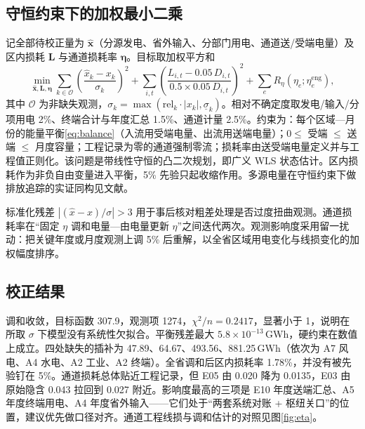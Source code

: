 \documentclass[UTF8,a4paper,zihao=-4,fontset=fandol]{ctexart}
\begin{document}
\subsection{守恒约束下的加权最小二乘}

记全部待校正量为 $\hat{\boldsymbol x}$（分源发电、省外输入、分部门用电、通道送/受端电量）及区内损耗 $\boldsymbol L$ 与通道损耗率 $\boldsymbol\eta$。目标取加权平方和\cite{Crowe1996data,Narasimhan1999data}
\begin{equation}
\min_{\hat{\boldsymbol x},\boldsymbol L,\boldsymbol\eta}
\sum_{k\in\mathcal O}
\left(\frac{\hat x_k-x_k}{\sigma_k}\right)^2
+\sum_{i,t}\left(\frac{L_{i,t}-0.05\,D_{i,t}}{0.5\times 0.05\,D_{i,t}}\right)^2
+\sum_e R_\eta(\eta_e;\eta_e^{\mathrm{eng}}),
\label{eq:wls}
\end{equation}
其中 $\mathcal O$ 为非缺失观测，$\sigma_k=\max(\mathrm{rel}_k\cdot|x_k|,\underline\sigma_k)$。相对不确定度取发电/输入/分项用电 2\%、终端合计与年度汇总 1.5\%、通道计量 2.5\%。约束为：每个区域—月份的能量平衡\eqref{eq:balance}（入流用受端电量、出流用送端电量）；$0\le$ 受端 $\le$ 送端 $\le$ 月度容量；工程记录为零的通道强制零流；损耗率由送受端电量定义并与工程值正则化。该问题是带线性守恒的凸二次规划，即广义 WLS 状态估计\cite{Schweppe1970power,Abur2004power}。区内损耗作为非负自由变量进入平衡，5\% 先验只起收缩作用。多源电量在守恒约束下做排放追踪的实证同构见文献\cite{deChalendar2021physics}。

标准化残差 $|(\hat x-x)/\sigma|>3$ 用于事后核对粗差处理是否过度扭曲观测\cite{Abur2004power}。通道损耗率在“固定 $\eta$ 调和电量—由电量更新 $\eta$”之间迭代两次。观测影响度采用留一扰动：把关键年度或月度观测上调 5\% 后重解，以全省区域用电变化与线损变化的加权幅度排序。

\subsection{校正结果}

调和收敛，目标函数 307.9，观测项 1274，$\chi^2/n=0.2417$，显著小于 1，说明在所取 $\sigma$ 下模型没有系统性欠拟合。平衡残差最大 $5.8\times 10^{-13}$\,GWh，硬约束在数值上成立。四处缺失的插补为 47.89、64.67、493.56、881.25\,GWh（依次为 A7 风电、A4 水电、A2 工业、A2 终端）。全省调和后区内损耗率 1.78\%，并没有被先验钉在 5\%。通道损耗总体贴近工程记录，但 E05 由 0.020 降为 0.0135，E03 由原始隐含 0.043 拉回到 0.027 附近。影响度最高的三项是 E10 年度送端汇总、A5 年度终端用电、A4 年度省外输入——它们处于“两套系统对账 + 枢纽关口”的位置，建议优先做口径对齐。通道工程线损与调和估计的对照见图\ref{fig:eta}。
\end{document}
